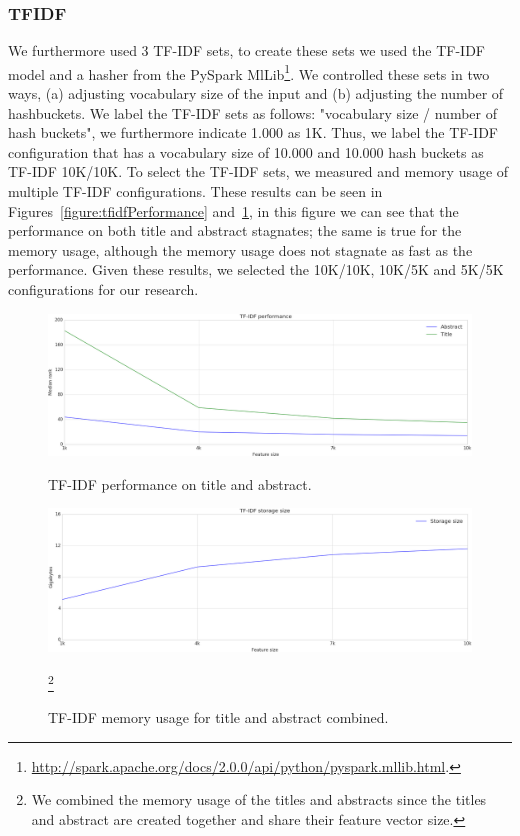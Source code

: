 \documentclass[runningheads]{llncs}
\begin{document}
\subsubsection{TFIDF}
We furthermore used 3 TF-IDF sets, to create these sets we used the TF-IDF model and a hasher from the PySpark MlLib\footnote{\url{http://spark.apache.org/docs/2.0.0/api/python/pyspark.mllib.html}.}. We controlled these sets in two ways, (a) adjusting vocabulary size of the input and (b) adjusting the number of hashbuckets. We label the TF-IDF sets as follows: "vocabulary size / number of hash buckets", we furthermore indicate 1.000 as 1K. Thus, we label the TF-IDF configuration that has a vocabulary size of 10.000 and 10.000 hash buckets as TF-IDF 10K/10K. To select the TF-IDF sets, we measured and memory usage of multiple TF-IDF configurations. These results can be seen in Figures~\ref{figure:tfidfPerformance} and~\ref{figure:tfidfMemory}, in this figure we can see that the performance on both title and abstract stagnates; the same is true for the memory usage, although the memory usage does not stagnate as fast as the performance. Given these results, we selected the 10K/10K, 10K/5K and 5K/5K configurations for our research.
\begin{figure}[hbt]
\includegraphics[width=5in]{Plots/tfidf_selection_plot_performance}
\caption{TF-IDF performance on title and abstract.}\label{figure:tfidfPerformance}
\includegraphics[width=5in]{Plots/tfidf_selection_plot_memory}
\caption{TF-IDF memory usage for title and abstract combined.}\footnote{We combined the memory usage of the titles and abstracts since the titles and abstract are created together and share their feature vector size.}\label{figure:tfidfMemory}
\end{figure}
\end{document}
